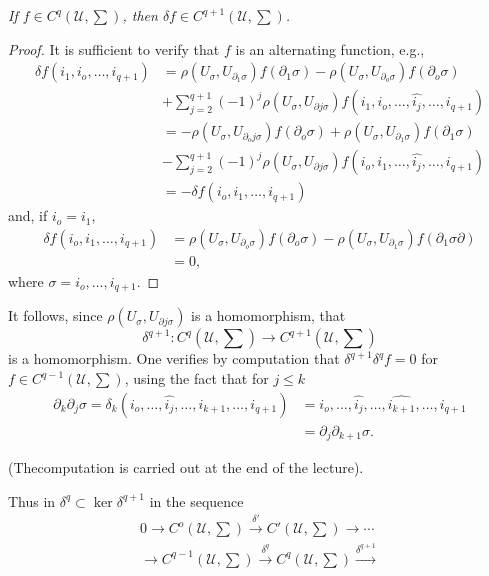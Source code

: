 \textit{If $f \in C^q (\mathscr{U}, \sum)$, then $\delta f \in
  C^{q+1} (\mathscr{U}, \sum)$.} 

\begin{proof}%
It is sufficient to verify that $f$ is an alternating function, e.g., 
\begin{align*}
\delta f(i_1, i_o, \ldots , i_{q + 1}) & = \rho (U_{\sigma},
U_{\partial_1 \sigma}) f(\partial_1 \sigma) - \rho (U_\sigma , U_{
  \partial_o \sigma}) f(\partial_o \sigma)\\ 
& + \sum^{q+1}_{j=2} (-1)^j \rho (U_\sigma , U_{\partial j \sigma})
f(i_1, i_o, \ldots , \hat{i_j}, \ldots , i_{q + 1})\\ 
& = -\rho (U_\sigma , U_{\partial_o j \sigma}) f(\partial_o \sigma) +
\rho (U_\sigma , U_{\partial_1 \sigma}) f(\partial_1 \sigma)\\ 
& - \sum^{q + 1}_{j = 2} (-1)^j \rho (U_\sigma , U_{\partial j
  \sigma}) f(i_o, i_1, \ldots , \hat{i_j} , \ldots , i_{q+1})\\ 
& = - \delta f(i_o , i_1, \ldots , i_{q+1}) 
\end{align*} 
and, if $i_o = i_1$,
\begin{align*}
\delta f(i_o, i_1, \ldots , i_{q+1}) &= \rho (U_\sigma , U_{\partial_o
  \sigma}) f(\partial_o \sigma) - \rho (U_\sigma , U_{\partial_1
  \sigma}) f(\partial_1 \sigma \partial)\\ 
&=0, 
\end{align*}
where $\sigma = i_o , \ldots , i_{q+1}$.
\end{proof}

It follows, since $\rho(U_\sigma , U_{\partial j \sigma})$ is a
homomorphism, that  
$$
\delta^{q+1} : C^q (\mathscr{U}, \sum) \to C^{q + 1} (\mathscr{U}, \sum)
$$
is a homomorphism. One verifies by computation that $\delta^{q+1}
\delta^q f =0$ for $f \in C^{q-1}(\mathscr{U}, \sum)$, using the fact
that for $j \le k$ 
\begin{align*}
\partial_k \partial_j \sigma = \delta_k (i_o, \ldots , \hat{i_j} , \ldots
, i_{k+1}, \ldots , i_{q+1}) & = i_o , \ldots , \hat{i_j} , \ldots ,
\hat{i_{k+1}}, \ldots , i_{q+1}\\ 
& = \partial_j \partial_{k+1} \sigma. 
\end{align*}

(The\pageoriginale computation is carried out at the end of the lecture).

Thus in $\delta^q \subset \ker \delta^{q+1}$ in the sequence
\begin{multline*}
0 \to C^o (\mathscr{U}, \sum) \xrightarrow{\delta'} C'(\mathscr{U}, 
\sum) \to \cdots \\
 \to C^{q-1}(\mathscr{U}, \sum) \xrightarrow{\delta^q}
C^q (\mathscr{U}, \sum)\xrightarrow{\delta^{q+1}} 
\end{multline*}


